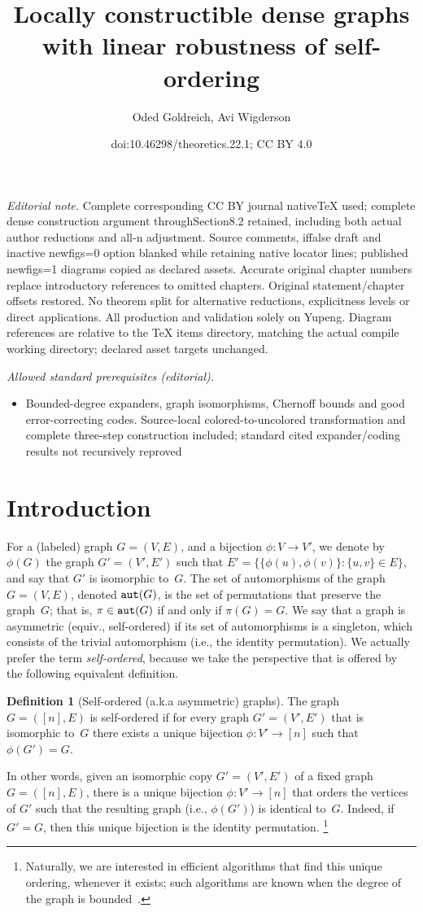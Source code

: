 \documentclass[10pt,a4paper]{article}
\title{Locally constructible dense graphs with linear robustness of self-ordering}
\author{Oded Goldreich, Avi Wigderson}
\date{doi:10.46298/theoretics.22.1; CC BY 4.0}
\theoremstyle{definition}
\newtheorem{definition}[theorem]{Definition}
\newcommand{\BD}{\begin{definition}}   \newcommand{\ED}{\end{definition}}
\begin{document}
\maketitle
\noindent\textit{Editorial note.} Complete corresponding CC BY journal nativeTeX used; complete dense construction argument throughSection8.2 retained, including both actual author reductions and all-n adjustment. Source comments, iffalse draft and inactive newfigs=0 option blanked while retaining native locator lines; published newfigs=1 diagrams copied as declared assets. Accurate original chapter numbers replace introductory references to omitted chapters. Original statement/chapter offsets restored. No theorem split for alternative reductions, explicitness levels or direct applications. All production and validation solely on Yupeng. Diagram references are relative to the TeX items directory, matching the actual compile working directory; declared asset targets unchanged.\par\medskip
\noindent\textit{Allowed standard prerequisites (editorial).}\begin{itemize}
\item Bounded-degree expanders, graph isomorphisms, Chernoff bounds and good error-correcting codes. Source-local colored-to-uncolored transformation and complete three-step construction included; standard cited expander/coding results not recursively reproved
\end{itemize}\medskip
\section{Introduction}
For a (labeled) graph $G=(V,E)$, and a bijection $\phi:V\to V'$,
we denote by $\phi(G)$ the graph $G'=(V',E')$
such that $E'=\{\{\phi(u),\phi(v)\}:\{u,v\}\!\in\!E\}$,
and say that $G'$ is {\sf isomorphic} to~$G$.
The set of {\sf automorphisms} of the graph $G=(V,E)$,
denoted ${\tt aut}(G)$,
is the set of permutations that preserve the graph~$G$;
that is, $\pi\in{\tt aut}(G)$ if and only if $\pi(G)=G$.
We say that a graph is {\sf asymmetric} (equiv., {\sf self-ordered})
if its set of automorphisms is a singleton,
which consists of the trivial automorphism
(i.e., the identity permutation).
We actually prefer the term {\em self-ordered}, because we take
the perspective that is offered by the following equivalent definition.

%
\BD[Self-ordered (a.k.a asymmetric) graphs]
\label{asymmetric:def}
%
The graph $G=([n],E)$ is {\sf self-ordered}
if for every graph $G'=(V',E')$ that is isomorphic to~$G$
there exists a unique bijection $\phi:V'\to[n]$ such that $\phi(G')=G$.
\ED
In other words,
given an isomorphic copy $G'=(V',E')$ of a fixed graph $G=([n],E)$,
there is a unique bijection $\phi:V'\to[n]$ that orders the vertices of $G'$
such that the resulting graph (i.e., $\phi(G')$) is identical to~$G$.
Indeed, if $G'=G$, then this unique bijection is the identity permutation.
\footnote{Naturally, we are interested in efficient algorithms
that find this unique ordering, whenever it exists;
such algorithms are known
when the degree of the graph is bounded~\cite{L}.}
\end{document}
